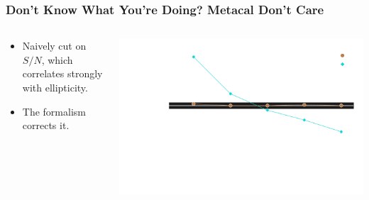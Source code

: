 \documentclass{beamer}
\newcommand{\snr}{$S/N$}
\begin{document}
\frame
{
    \frametitle{Don't Know What You're Doing?  Metacal Don't Care}
 
 
    \begin{columns}
        \begin{column}{0.4\textwidth}
            \begin{itemize}
                \item Naively cut on {\color{lightsteelblue} \snr}, which correlates
                    strongly with ellipticity.
                \item The formalism corrects it.
            \end{itemize}
        \end{column}
        \begin{column}{0.6\textwidth}
            \begin{center}
            \includegraphics[width=\textwidth]{mc-select-bias-thresh-with-nocorr-inv.pdf}
                \newline
            \end{center}
        \end{column}
    \end{columns}


}
\end{document}
